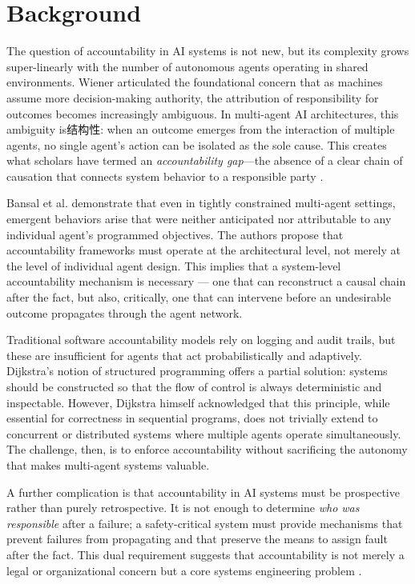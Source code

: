 \section{Background}


The question of accountability in AI systems is not new, but its complexity grows super-linearly with the number of autonomous agents operating in shared environments. Wiener \cite{wiener1948} articulated the foundational concern that as machines assume more decision-making authority, the attribution of responsibility for outcomes becomes increasingly ambiguous. In multi-agent AI architectures, this ambiguity is结构性: when an outcome emerges from the interaction of multiple agents, no single agent's action can be isolated as the sole cause. This creates what scholars have termed an \textit{accountability gap}---the absence of a clear chain of causation that connects system behavior to a responsible party \cite{bansal2019}.

Bansal et al. \cite{bansal2019} demonstrate that even in tightly constrained multi-agent settings, emergent behaviors arise that were neither anticipated nor attributable to any individual agent's programmed objectives. The authors propose that accountability frameworks must operate at the architectural level, not merely at the level of individual agent design. This implies that a system-level accountability mechanism is necessary --- one that can reconstruct a causal chain after the fact, but also, critically, one that can intervene before an undesirable outcome propagates through the agent network.

Traditional software accountability models rely on logging and audit trails, but these are insufficient for agents that act probabilistically and adaptively. Dijkstra's notion of structured programming \cite{dijkstra1982} offers a partial solution: systems should be constructed so that the flow of control is always deterministic and inspectable. However, Dijkstra himself acknowledged that this principle, while essential for correctness in sequential programs, does not trivially extend to concurrent or distributed systems where multiple agents operate simultaneously. The challenge, then, is to enforce accountability without sacrificing the autonomy that makes multi-agent systems valuable.

A further complication is that accountability in AI systems must be prospective rather than purely retrospective. It is not enough to determine \textit{who was responsible} after a failure; a safety-critical system must provide mechanisms that prevent failures from propagating and that preserve the means to assign fault after the fact. This dual requirement suggests that accountability is not merely a legal or organizational concern but a core systems engineering problem \cite{tristr81}.


